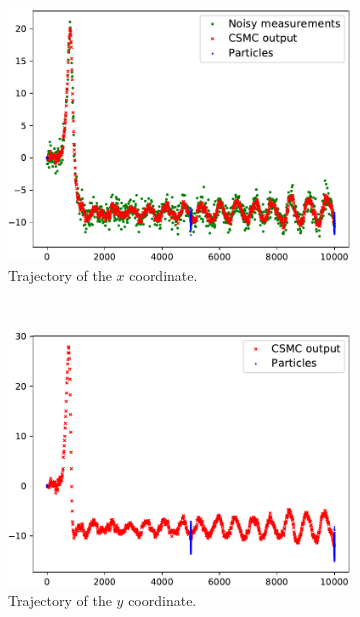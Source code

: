 \documentclass[english, DIV=13]{scrartcl}
\begin{document}
\begin{figure}
    \centering
    \begin{subfigure}{0.49\textwidth}
        \includegraphics[width=\textwidth]{figures/x-trajectory-data}
        \caption{Trajectory of the $x$ coordinate.} 
        \label{fig:x-trajectory-data}
    \end{subfigure}%
    ~
    \begin{subfigure}{0.49\textwidth}
        \includegraphics[width=\textwidth]{figures/y-trajectory-data}
        \caption{Trajectory of the $y$ coordinate.} 
        \label{fig:y-trajectory-data}
    \end{subfigure}\\
    \begin{subfigure}{0.49\textwidth}

\end{subfigure}
\end{figure}
\end{document}
